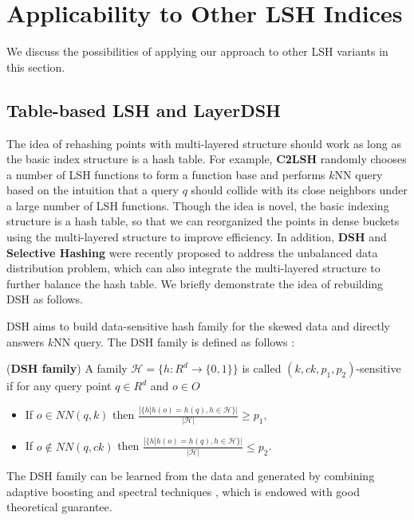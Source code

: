 \section{Applicability to Other LSH Indices}
\label{sec:extension}

We discuss the possibilities of applying our approach to other LSH variants in this section.

\subsection{Table-based LSH and LayerDSH}
\label{sec:extension:dsh}

The idea of rehashing points with multi-layered structure should work as long as the basic index structure is a hash table.
For example, \textbf{C2LSH} \cite{c2lsh} randomly chooses a number of LSH functions to form a function base and performs $k$NN query based on the intuition that a query $q$ should collide with its close neighbors under a large number of LSH functions. Though the idea is novel, the basic indexing structure is a hash table, so that we can reorganized the points in dense buckets using the multi-layered structure to improve efficiency. In addition, \textbf{DSH} \cite{Gao:2014:DDS:2588555.2588565} and \textbf{Selective Hashing} \cite{Gao:2015:SHC:2783258.2783284} were recently proposed to address the unbalanced data distribution problem, which can also integrate the multi-layered structure to further balance the hash table. We briefly demonstrate the idea of rebuilding DSH as follows.


 DSH \cite{Gao:2014:DDS:2588555.2588565} aims to build data-sensitive hash family for the skewed data and directly answers $k$NN query. The DSH family is defined as follows \cite{Gao:2014:DDS:2588555.2588565}:
\begin{definition}
\label{def:dsh}
(\textbf{DSH family}) A family $\mathcal{H}=\{h:R^d\rightarrow\{0,1\}\}$ is called $(k,ck,p_1,p_2)$-sensitive if for any query point $q\in R^d$ and $o\in O$
\begin{itemize}
  \item If $o\in NN(q,k)$ then $\frac{|\{h|h(o)=h(q),h\in\mathcal{H}\}|}{|\mathcal{H}|}\geq p_1$,
  \item If $o\notin NN(q,ck)$ then $\frac{|\{h|h(o)=h(q),h\in\mathcal{H}\}|}{|\mathcal{H}|}\leq p_2$.
\end{itemize}
\end{definition}
The DSH family can be learned from the data and generated by combining adaptive boosting and spectral techniques \cite{Gao:2014:DDS:2588555.2588565}, which is endowed with good theoretical guarantee.

